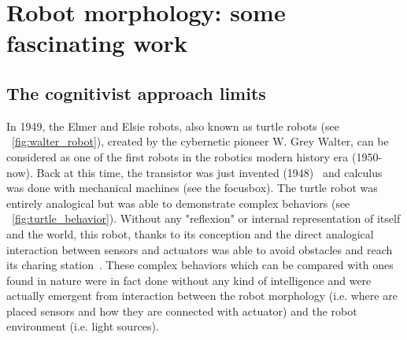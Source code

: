 
\cleartoleftpage



\chapter{Robot morphology: some fascinating work} %


\section{The cognitivist approach limits} %

In 1949, the Elmer and Elsie robots, also known as turtle robots (see \figurename~\ref{fig:walter_robot}), created by the cybernetic pioneer W. Grey Walter, can be considered as one of the first robots in the robotics modern history era (1950-now). Back at this time, the transistor was just invented (1948)~\cite{brinkman1997history} and calculus was done with mechanical machines (see the focusbox). The turtle robot was entirely analogical but was able to demonstrate complex behaviors (see \figurename~\ref{fig:turtle_behavior}). Without any "reflexion" or internal representation of itself and the world, this robot, thanks to its conception and the direct analogical interaction between sensors and actuators was able to avoid obstacles and reach its charing station~\cite{walter1950imitation}. These complex behaviors which can be compared with ones found in nature were in fact done without any kind of intelligence and were actually emergent from interaction between the robot morphology (i.e. where are placed sensors and how they are connected with actuator) and the robot environment (i.e. light sources).

\begin{figure}[]
\centering
    \hfil
    \caption{}
    \label{fig:turtle_robot}
\end{figure}

